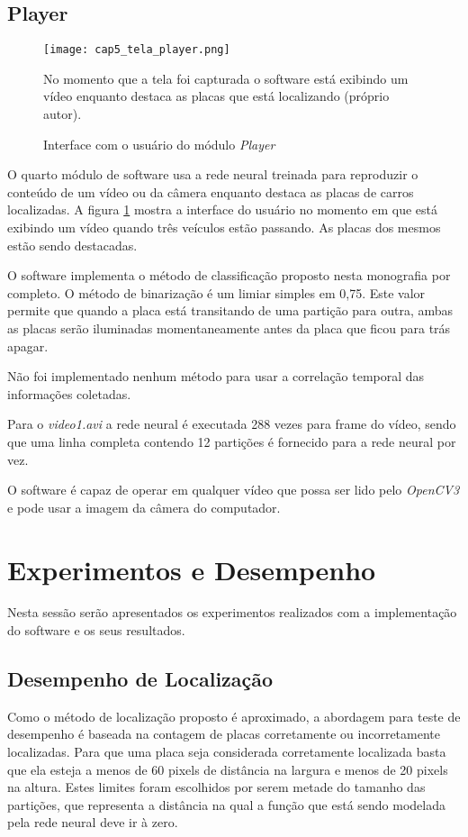 \subsection{Player}

\begin{figure}[!htb]
	\centering
	\texttt{[image: cap5\_tela\_player.png]}
	\caption{Interface com o usuário do módulo \emph{Player}}
	\label{fig:cap5_tela_player}
	No momento que a tela foi capturada o software está exibindo um vídeo
	enquanto destaca as placas que está localizando (próprio autor).
\end{figure}

O quarto módulo de software usa a rede neural treinada para reproduzir o
conteúdo de um vídeo ou da câmera enquanto destaca as placas de carros
localizadas. A figura \ref{fig:cap5_tela_player} mostra a interface do usuário
no momento em que está exibindo um vídeo quando três veículos estão passando.
As placas dos mesmos estão sendo destacadas.

O software implementa o método de classificação proposto nesta monografia por
completo. O método de binarização é um limiar simples em 0,75. Este valor
permite que quando a placa está transitando de uma partição para outra, ambas
as placas serão iluminadas momentaneamente antes da placa que ficou para trás
apagar.

Não foi implementado nenhum método para usar a correlação temporal das
informações coletadas.

Para o \emph{video1.avi} a rede neural é executada 288 vezes para frame do
vídeo, sendo que uma linha completa contendo 12 partições é fornecido para a
rede neural por vez.

O software é capaz de operar em qualquer vídeo que possa ser lido pelo
\emph{OpenCV3} e pode usar a imagem da câmera do computador.

\section{Experimentos e Desempenho}

Nesta sessão serão apresentados os experimentos realizados com a implementação
do software e os seus resultados.

\subsection{Desempenho de Localização}

Como o método de localização proposto é aproximado, a abordagem para teste de
desempenho é baseada na contagem de placas corretamente ou
incorretamente localizadas. Para que uma placa seja considerada corretamente
localizada basta que ela esteja a menos de 60 pixels de distância na largura e
menos de 20 pixels na altura. Estes limites foram escolhidos por serem metade
do tamanho das partições, que representa a distância na qual a função que está
sendo modelada pela rede neural deve ir à zero.
	
